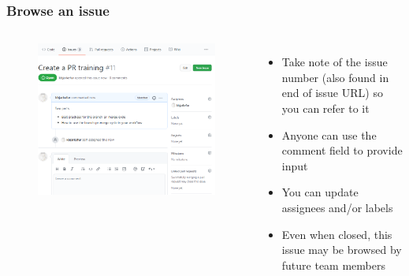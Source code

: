 \documentclass[aspectratio=169]{beamer} %
\begin{document}
\begin{frame}
	\frametitle{Browse an issue}
	\begin{columns}[c]

		\vspace{-.5cm}
		\begin{figure}
			\centering
			\includegraphics[width=\textwidth]{./img/create-issue-2.png}
		\end{figure}


		\begin{itemize}
			\setlength\itemsep{1em}
			\item Take note of the issue number (also found in end of issue URL) so you can refer to it
			\item Anyone can use the comment field to provide input
			\item You can update assignees and/or labels
			\item Even when closed, this issue may be browsed by future team members
		\end{itemize}

	\end{columns}
\end{frame}
\end{document}
